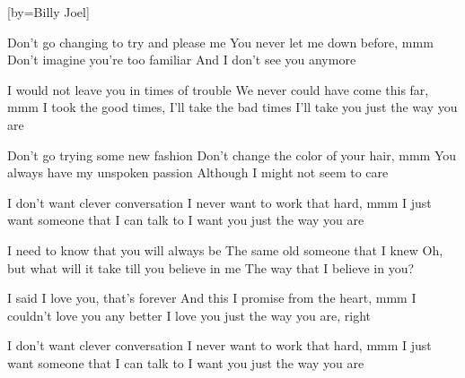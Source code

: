 [by={Billy Joel}]

  \beginverse
  Don't go changing to try and please me
  You never let me down before, mmm
  Don't imagine you're too familiar
  And I don't see you anymore
  \endverse

  \beginverse
  I would not leave you in times of trouble
  We never could have come this far, mmm
  I took the good times, I'll take the bad times
  I'll take you just the way you are
  \endverse

  \beginverse
  Don't go trying some new fashion
  Don't change the color of your hair, mmm
  You always have my unspoken passion
  Although I might not seem to care
  \endverse

  \beginverse
  I don't want clever conversation
  I never want to work that hard, mmm
  I just want someone that I can talk to
  I want you just the way you are
  \endverse

  \beginverse
  I need to know that you will always be
  The same old someone that I knew
  Oh, but what will it take till you believe in me
  The way that I believe in you?
  \endverse

  \beginverse
  I said I love you, that's forever
  And this I promise from the heart, mmm
  I couldn't love you any better
  I love you just the way you are, right
  \endverse

  \beginverse
  I don't want clever conversation
  I never want to work that hard, mmm
  I just want someone that I can talk to
  I want you just the way you are
  \endverse
\endsong
